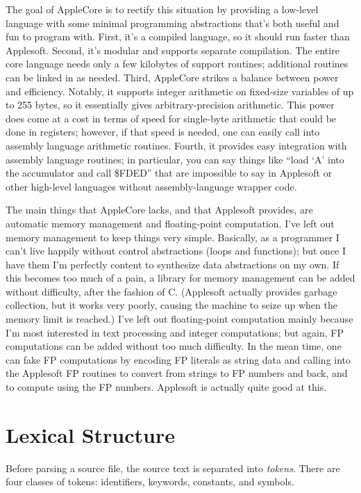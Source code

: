 \documentclass[10pt]{article}
\begin{document}
The goal of AppleCore is to rectify this situation by providing a
low-level language with some minimal programming abstractions that's
both useful and fun to program with.  First, it's a compiled language,
so it should run faster than Applesoft.  Second, it's modular and
supports separate compilation. The entire core language needs only a
few kilobytes of support routines; additional routines can be linked
in as needed.  Third, AppleCore strikes a balance between power and
efficiency.  Notably, it supports integer arithmetic on fixed-size
variables of up to 255 bytes, so it essentially gives
arbitrary-precision arithmetic.  This power does come at a cost in
terms of speed for single-byte arithmetic that could be done in
registers; however, if that speed is needed, one can easily call into
assembly language arithmetic routines.  Fourth, it provides easy
integration with assembly language routines; in particular, you can
say things like ``load `A' into the accumulator and call \$FDED'' that
are impossible to say in Applesoft or other high-level languages
without assembly-language wrapper code.

The main things that AppleCore lacks, and that Applesoft provides, are
automatic memory management and floating-point computation.  I've left
out memory management to keep things very simple.  Basically, as a
programmer I can't live happily without control abstractions (loops
and functions); but once I have them I'm perfectly content to
synthesize data abstractions on my own.  If this becomes too much of a
pain, a library for memory management can be added without difficulty,
after the fashion of C.  (Applesoft actually provides garbage
collection, but it works very poorly, causing the machine to seize up
when the memory limit is reached.)  I've left out floating-point
computation mainly because I'm most interested in text processing and
integer computations; but again, FP computations can be added without
too much difficulty.  In the mean time, one can fake FP computations
by encoding FP literals as string data and calling into the Applesoft
FP routines to convert from strings to FP numbers and back, and to
compute using the FP numbers.  Applesoft is actually quite good at
this.

\section{Lexical Structure}

Before parsing a source file, the source text is separated into
\emph{tokens}.  There are four classes of tokens: identifiers,
keywords, constants, and symbols.
\end{document}
